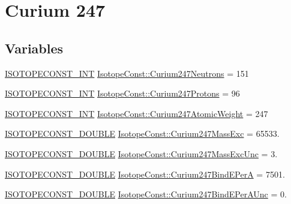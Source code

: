 \hypertarget{group___isotope_const-_curium-_cm247}{}\section{Curium 247}
\label{group___isotope_const-_curium-_cm247}
\subsection*{Variables}
\begin{DoxyCompactItemize}
\item 
\mbox{\hyperlink{group___isotope_const-_macros_ga5f18360b3e99483a35c32d789e62621c}{I\+S\+O\+T\+O\+P\+E\+C\+O\+N\+S\+T\+\_\+\+I\+NT}} \mbox{\hyperlink{group___isotope_const-_curium-_cm247_ga4f86f6a54d7c28a8da0c777e1cfae00c}{Isotope\+Const\+::\+Curium247\+Neutrons}} = 151
\item 
\mbox{\hyperlink{group___isotope_const-_macros_ga5f18360b3e99483a35c32d789e62621c}{I\+S\+O\+T\+O\+P\+E\+C\+O\+N\+S\+T\+\_\+\+I\+NT}} \mbox{\hyperlink{group___isotope_const-_curium-_cm247_ga9bacde9b6155763d445b3797ffa37165}{Isotope\+Const\+::\+Curium247\+Protons}} = 96
\item 
\mbox{\hyperlink{group___isotope_const-_macros_ga5f18360b3e99483a35c32d789e62621c}{I\+S\+O\+T\+O\+P\+E\+C\+O\+N\+S\+T\+\_\+\+I\+NT}} \mbox{\hyperlink{group___isotope_const-_curium-_cm247_gabf3b7846549504afee442a0adc8b508f}{Isotope\+Const\+::\+Curium247\+Atomic\+Weight}} = 247
\item 
\mbox{\hyperlink{group___isotope_const-_macros_ga8f45a7272ce02c0b4c65c44636ed719a}{I\+S\+O\+T\+O\+P\+E\+C\+O\+N\+S\+T\+\_\+\+D\+O\+U\+B\+LE}} \mbox{\hyperlink{group___isotope_const-_curium-_cm247_ga7db2e22adf3d9e45f41fc4ae682688df}{Isotope\+Const\+::\+Curium247\+Mass\+Exc}} = 65533.
\item 
\mbox{\hyperlink{group___isotope_const-_macros_ga8f45a7272ce02c0b4c65c44636ed719a}{I\+S\+O\+T\+O\+P\+E\+C\+O\+N\+S\+T\+\_\+\+D\+O\+U\+B\+LE}} \mbox{\hyperlink{group___isotope_const-_curium-_cm247_gad9a733553adbac9c14dc339c9ac9391e}{Isotope\+Const\+::\+Curium247\+Mass\+Exc\+Unc}} = 3.
\item 
\mbox{\hyperlink{group___isotope_const-_macros_ga8f45a7272ce02c0b4c65c44636ed719a}{I\+S\+O\+T\+O\+P\+E\+C\+O\+N\+S\+T\+\_\+\+D\+O\+U\+B\+LE}} \mbox{\hyperlink{group___isotope_const-_curium-_cm247_gaef19e178de4c9e34838d69b50c7deb3d}{Isotope\+Const\+::\+Curium247\+Bind\+E\+PerA}} = 7501.
\item 
\mbox{\hyperlink{group___isotope_const-_macros_ga8f45a7272ce02c0b4c65c44636ed719a}{I\+S\+O\+T\+O\+P\+E\+C\+O\+N\+S\+T\+\_\+\+D\+O\+U\+B\+LE}} \mbox{\hyperlink{group___isotope_const-_curium-_cm247_ga7d92c11ccd13194234196e9eb5c514e9}{Isotope\+Const\+::\+Curium247\+Bind\+E\+Per\+A\+Unc}} = 0.

\end{DoxyCompactItemize}
